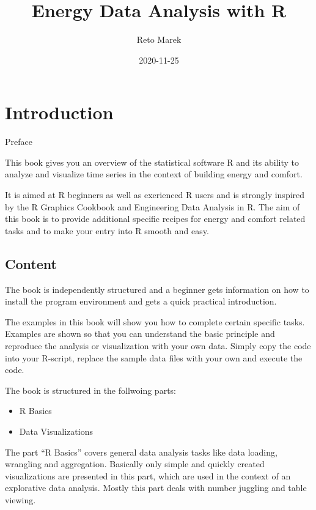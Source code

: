 \documentclass[
]{book}
\title{Energy Data Analysis with R}
\author{Reto Marek}
\date{2020-11-25}
\begin{document}
\maketitle

{
\setcounter{tocdepth}{1}
\tableofcontents
}
\hypertarget{intro}{%
\chapter{Introduction}\label{intro}}

Preface

This book gives you an overview of the statistical software R and its ability to analyze and visualize time series in the context of building energy and comfort.

It is aimed at R beginners as well as exerienced R users and is strongly inspired by the R Graphics Cookbook and Engineering Data Analysis in R. The aim of this book is to provide additional specific recipes for energy and comfort related tasks and to make your entry into R smooth and easy.

\hypertarget{content}{%
\section{Content}\label{content}}

The book is independently structured and a beginner gets information on how to install the program environment and gets a quick practical introduction.

The examples in this book will show you how to complete certain specific tasks. Examples are shown so that you can understand the basic principle and reproduce the analysis or visualization with your own data. Simply copy the code into your R-script, replace the sample data files with your own and execute the code.

The book is structured in the follwoing parts:

\begin{itemize}
\item
  R Basics
\item
  Data Visualizations
\end{itemize}

The part ``R Basics'' covers general data analysis tasks like data loading, wrangling and aggregation. Basically only simple and quickly created visualizations are presented in this part, which are used in the context of an explorative data analysis. Mostly this part deals with number juggling and table viewing.
\end{document}
